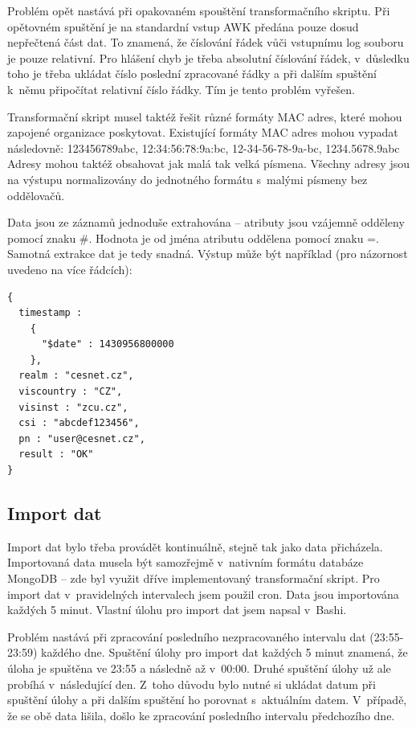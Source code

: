 \documentclass[thesis=M,czech]{FITthesis}[2012/06/26]
\begin{document}
      Problém opět nastává při opakovaném spouštění transformačního skriptu.
      Při opětovném spuštění je na standardní vstup AWK předána pouze dosud nepřečtená část dat. 
      To znamená, že číslování řádek vůči vstupnímu log souboru je pouze relativní.
      Pro hlášení chyb je třeba absolutní číslování řádek, v~důsledku toho
      je třeba ukládat číslo poslední zpracované řádky a při dalším spuštění
      k~němu připočítat relativní číslo řádky. Tím je tento problém vyřešen.

      Transformační skript musel taktéž řešit různé formáty MAC adres,
      které mohou zapojené organizace poskytovat.
      Existující formáty MAC adres mohou vypadat následovně: 123456789abc, 12:34:56:78:9a:bc, 12-34-56-78-9a-bc, 1234.5678.9abc
      Adresy mohou taktéž obsahovat jak malá tak velká písmena.
      Všechny adresy jsou na výstupu normalizovány do jednotného formátu s~malými písmeny bez oddělovačů.

      Data jsou ze záznamů jednoduše extrahována -- atributy jsou vzájemně odděleny pomocí znaku \#.
      Hodnota je od jména atributu oddělena pomocí znaku =.
      Samotná extrakce dat je tedy snadná.
      Výstup může být například (pro názornost uvedeno na více řádcích):
      \begin{verbatim}
{ 
  timestamp : 
    { 
      "$date" : 1430956800000 
    }, 
  realm : "cesnet.cz", 
  viscountry : "CZ", 
  visinst : "zcu.cz", 
  csi : "abcdef123456", 
  pn : "user@cesnet.cz", 
  result : "OK" 
}
      \end{verbatim}

    \subsection{Import dat}
      Import dat bylo třeba provádět kontinuálně, stejně tak jako data přicházela.
      Importovaná data musela být samozřejmě v~nativním formátu databáze MongoDB -- 
      zde byl využit dříve implementovaný transformační skript.
      Pro import dat v~pravidelných intervalech jsem použil cron.
      Data jsou importována každých 5 minut.
      Vlastní úlohu pro import dat jsem napsal v~Bashi. 

      Problém nastává při zpracování posledního nezpracovaného intervalu dat (23:55-23:59)
      každého dne. Spuštění úlohy pro import dat každých 5 minut znamená, že
      úloha je spuštěna ve 23:55 a následně až v~00:00. 
      Druhé spuštění úlohy už ale probíhá v~následující den. Z~toho důvodu bylo
      nutné si ukládat datum při spuštění úlohy a při dalším spuštění ho porovnat s~aktuálním datem.
      V~případě, že se obě data lišila, došlo ke zpracování posledního intervalu předchozího dne.
\end{document}

